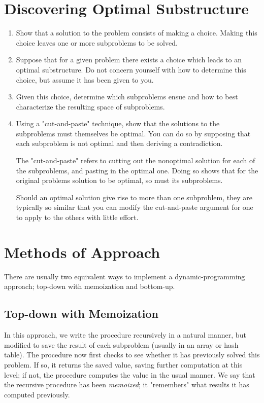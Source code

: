 \section{Discovering Optimal Substructure}
\begin{enumerate}
	\item Show that a solution to the problem consists of making a choice.
Making this choice leaves one or more subproblems to be solved.
	\item Suppose that for a given problem there exists a choice which leads
to an optimal substructure. Do not concern yourself with how to determine this
choice, but assume it has been given to you.
	\item Given this choice, determine which subproblems ensue and how to best
characterize the resulting space of subproblems.
	\item Using a "cut-and-paste" technique, show that the solutions to the
subproblems must themselves be optimal. You can do so by supposing that each
subproblem is not optimal and then deriving a contradiction.

The "cut-and-paste" refers to cutting out the nonoptimal solution for each of
the subproblems, and pasting in the optimal one. Doing so shows that for the
original problems solution to be optimal, so must its subproblems.

Should an optimal solution give rise to more than one subproblem, they are
typically so similar that you can modify the cut-and-paste argument for one to
apply to the others with little effort.
\end{enumerate}

\newpage
\section{Methods of Approach}
There are usually two equivalent ways to implement a dynamic-programming
approach; top-down with memoization and bottom-up.

\subsection{Top-down with Memoization}
In this approach, we write the procedure recursively in a natural manner, but
modified to save the result of each subproblem (usually in an array or hash
table). The procedure now first checks to see whether it has previously solved
this problem. If so, it returns the saved value, saving further computation at
this level; if not, the procedure computes the value in the usual manner. We
say that the recursive procedure has been \textit{memoized}; it "remembers"
what results it has computed previously.

